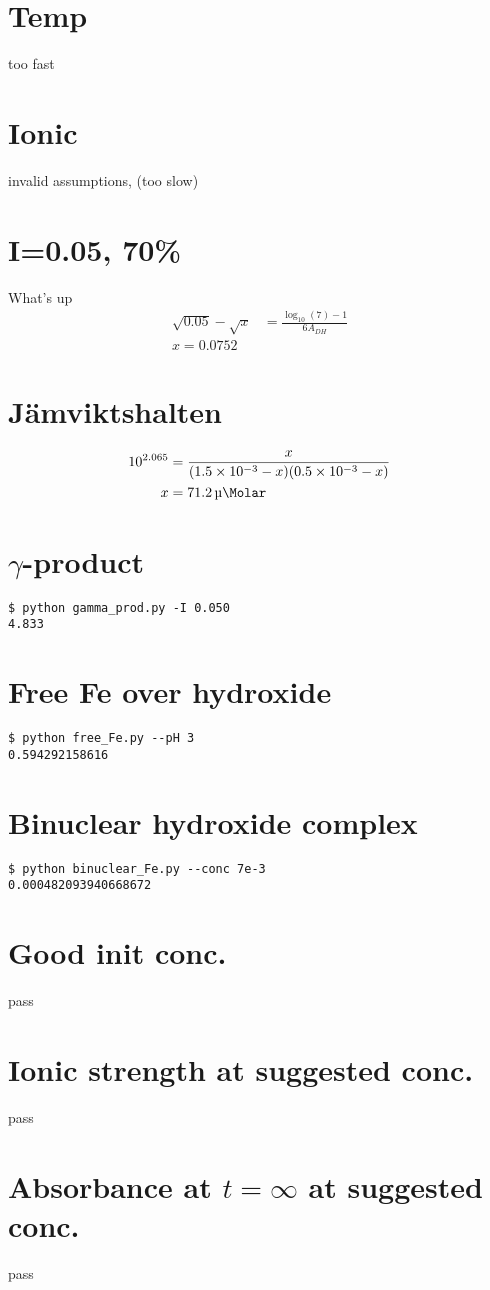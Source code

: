 \documentclass{article}
\begin{document}
\section{Temp}
too fast

\section{Ionic}
invalid assumptions, (too slow)

\section{I=0.05, 70\%}
What's up
\begin{align}
\sqrt{0.05} - \sqrt{x} &= \frac{\log_{10}(7) - 1}{6A_{DH}} \\
x = 0.0752
\end{align}

\section{Jämviktshalten }
\begin{align}
10^{2.065} &= \frac{x}{(\num{1.5e-3} - x)(\num{0.5e-3} - x)} \\
x &= \SI{71.2}{\micro\Molar}
\end{align}

\section{$\gamma$-product}
\begin{verbatim}
$ python gamma_prod.py -I 0.050
4.833
\end{verbatim}

\section{Free Fe over hydroxide}
\begin{verbatim}
$ python free_Fe.py --pH 3
0.594292158616
\end{verbatim}

\section{Binuclear hydroxide complex}
\begin{verbatim}
$ python binuclear_Fe.py --conc 7e-3
0.000482093940668672
\end{verbatim}

\section{Good init conc.}
pass

\section{Ionic strength at suggested conc.}
pass

\section{Absorbance at $t = \infty$ at suggested conc.}
pass
\end{document}
